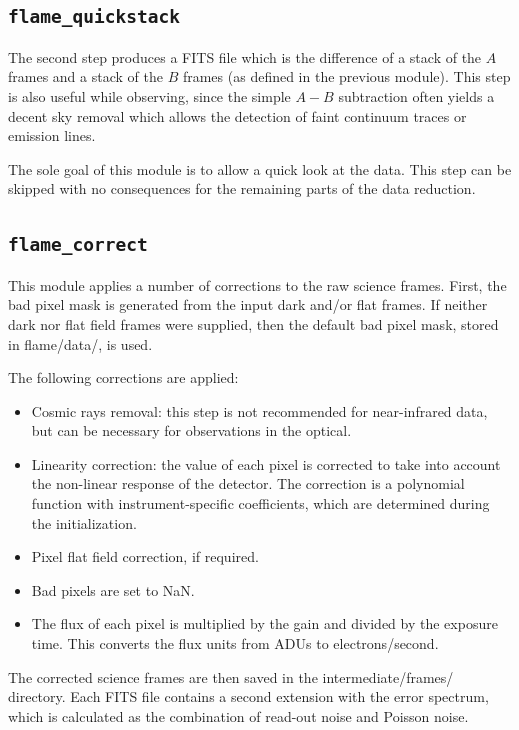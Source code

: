 \documentclass[a4paper, notitlepage]{article}
\begin{document}
\subsection{\texttt{flame\_quickstack}}

The second step produces a FITS file which is the difference of a stack of the $A$ frames and a stack of the $B$ frames (as defined in the previous module). This step is also useful while observing, since the simple $A-B$ subtraction often yields a decent sky removal which allows the detection of faint continuum traces or emission lines.

The sole goal of this module is to allow a quick look at the data. This step can be skipped with no consequences for the remaining parts of the data reduction.



\subsection{\texttt{flame\_correct}}

This module applies a number of corrections to the raw science frames. First, the bad pixel mask is generated from the input dark and/or flat frames. If neither dark nor flat field frames were supplied, then the default bad pixel mask, stored in flame/data/, is used.

The following corrections are applied:
\begin{itemize}
\item Cosmic rays removal: this step is not recommended for near-infrared data, but can be necessary for observations in the optical.
\item Linearity correction: the value of each pixel is corrected to take into account the non-linear response of the detector. The correction is a polynomial function with instrument-specific coefficients, which are determined during the initialization.
\item Pixel flat field correction, if required.
\item Bad pixels are set to NaN.
\item The flux of each pixel is multiplied by the gain and divided by the exposure time. This converts the flux units from ADUs to electrons/second.
\end{itemize}

The corrected science frames are then saved in the intermediate/frames/ directory. Each FITS file contains a second extension with the error spectrum, which is calculated as the combination of read-out noise and Poisson noise.
\end{document}

